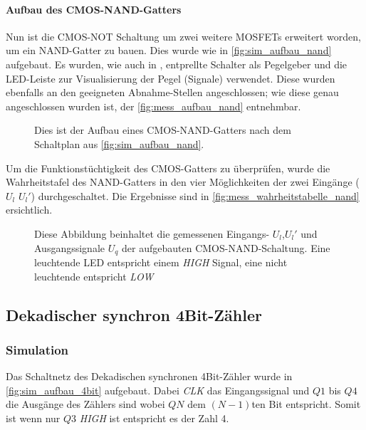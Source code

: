 \documentclass[12pt,english,ngerman]{scrartcl}
\begin{document}
\paragraph{Aufbau des CMOS-NAND-Gatters}
Nun ist die CMOS-NOT Schaltung um zwei weitere MOSFETs erweitert worden, um ein
NAND-Gatter zu bauen. Dies wurde wie in \autoref{fig:sim_aufbau_nand} aufgebaut.
Es wurden, wie auch in , entprellte Schalter als
Pegelgeber und die LED-Leiste zur Visualisierung der Pegel (Signale) verwendet.
Diese wurden ebenfalls an den geeigneten Abnahme-Stellen angeschlossen; wie diese genau
angeschlossen wurden ist, der \autoref{fig:mess_aufbau_nand} entnehmbar.

\begin{figure}[H]
  \centering
  \caption{Dies ist der Aufbau eines CMOS-NAND-Gatters nach dem Schaltplan aus
  \autoref{fig:sim_aufbau_nand}.}
  \label{fig:mess_aufbau_nand}
\end{figure}

Um die Funktionstüchtigkeit des CMOS-Gatters zu überprüfen, wurde die
Wahrheitstafel des NAND-Gatters in den vier Möglichkeiten der zwei Eingänge ($U_l$ $U_l'$) durchgeschaltet.
Die Ergebnisse sind in \autoref{fig:mess_wahrheitstabelle_nand}
ersichtlich.


\begin{figure}[H]
  \centering
  \caption{Diese Abbildung beinhaltet die gemessenen Eingangs- $U_l$,$U_l'$ und
  Ausgangssignale $U_q$ der aufgebauten CMOS-NAND-Schaltung. Eine leuchtende
  LED entspricht einem \textit{HIGH} Signal, eine nicht leuchtende entspricht
  \textit{LOW}}
  \label{fig:mess_wahrheitstabelle_nand}
\end{figure}


\subsection{Dekadischer synchron 4Bit-Zähler}
\subsubsection{Simulation}

Das Schaltnetz des Dekadischen synchronen 4Bit-Zähler wurde in
\autoref{fig:sim_aufbau_4bit} aufgebaut. Dabei \textit{CLK} das Eingangssignal
und $Q1$ bis $Q4$ die Ausgänge des Zählers sind wobei $QN$ dem $(N-1)$ten Bit
entspricht. Somit ist wenn nur $Q3$ \textit{HIGH} ist entspricht es der Zahl 4.
\end{document}
